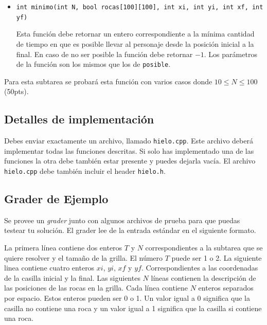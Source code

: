 \documentclass{oci}
\begin{document}
\begin{itemize}
	\item \verb+int minimo(int N, bool rocas[100][100], int xi, int yi, int xf, int yf)+

	Esta función debe retornar un entero correspondiente a la mínima cantidad de tiempo en que es posible llevar al personaje desde la posición inicial a la final.
  En caso de no ser posible la función debe retornar $-1$.
  Los parámetros de la función son los mismos que los de \verb+posible+.
\end{itemize}

Para esta subtarea se probará esta función con varios casos donde $10 \leq N\leq 100$ (50pts).

\subsection*{Detalles de implementación}
Debes enviar exactamente un archivo, llamado \verb+hielo.cpp+.
Este archivo deberá implementar todas las funciones descritas.
Si solo has implementado una de las funciones la otra debe también estar presente y puedes dejarla vacía.
El archivo \verb+hielo.cpp+ debe también incluir el header \verb+hielo.h+.

\subsection*{Grader de Ejemplo}
Se provee un \emph{grader} junto con algunos archivos de prueba para que puedas testear tu solución.
El grader lee de la entrada estándar en el siguiente formato.

La primera línea contiene dos enteros $T$ y $N$ correspondientes a la subtarea que se quiere resolver y el tamaño de la grilla.
El número $T$ puede ser 1 o 2.
La siguiente linea contiene cuatro enteros $xi$, $yi$, $xf$ y $yf$.
Correspondientes a las coordenadas de la casilla inicial y la final.
Las siguientes $N$ líneas contienen la descripción de las posiciones de las rocas en la grilla.
Cada línea contiene $N$ enteros separados por espacio.
Estos enteros pueden ser 0 o 1.
Un valor igual a 0 significa que la casilla no contiene una roca y un valor igual a 1 significa que la casilla si contiene una roca.
\end{document}
